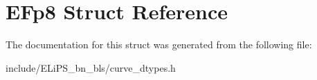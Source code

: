 \hypertarget{struct_e_fp8}{}\section{E\+Fp8 Struct Reference}
\label{struct_e_fp8}


The documentation for this struct was generated from the following file\+:\begin{DoxyCompactItemize}
\item 
include/\+E\+Li\+P\+S\+\_\+bn\+\_\+bls/curve\+\_\+dtypes.\+h\end{DoxyCompactItemize}
